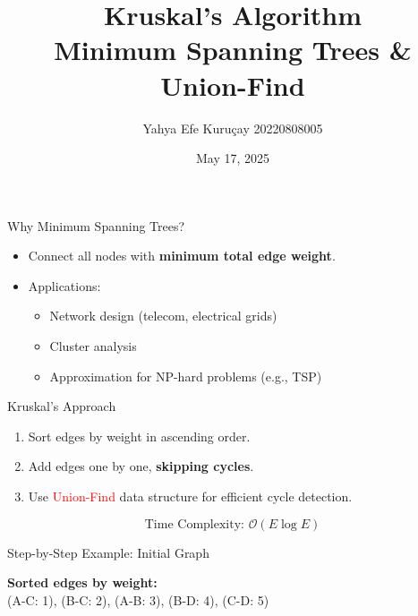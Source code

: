 \documentclass{beamer}
\title[Kruskal's Algorithm]{Kruskal's Algorithm\\[4pt]\Large\textbf{Minimum Spanning Trees \& Union-Find}}
\author{Yahya Efe Kuruçay 20220808005}
\date{May 17, 2025} %
\begin{document}
\begin{frame}
  \titlepage
\end{frame}

\begin{frame}{Why Minimum Spanning Trees?}
  \begin{itemize}
    \item Connect all nodes with \textbf{minimum total edge weight}.
    \item Applications:
      \begin{itemize}
        \item Network design (telecom, electrical grids)
        \item Cluster analysis
        \item Approximation for NP-hard problems (e.g., TSP)
      \end{itemize}
  \end{itemize}
\end{frame}

\begin{frame}{Kruskal's Approach}
\begin{enumerate}
  \item Sort edges by weight in ascending order.
  \item Add edges one by one, \textbf{skipping cycles}.
  \item Use \textcolor{red}{Union-Find} data structure for efficient cycle detection.
\end{enumerate}
\vfill
\[
\text{Time Complexity: } \mathcal{O}(E \log E)
\]
\end{frame}

\begin{frame}{Step-by-Step Example: Initial Graph}
\centering
{}
\vspace{0.5cm}
\RaggedRight
\scriptsize
\textbf{Sorted edges by weight:} \\ (A-C: 1), (B-C: 2), (A-B: 3), (B-D: 4), (C-D: 5)
\end{frame}
\end{document}
